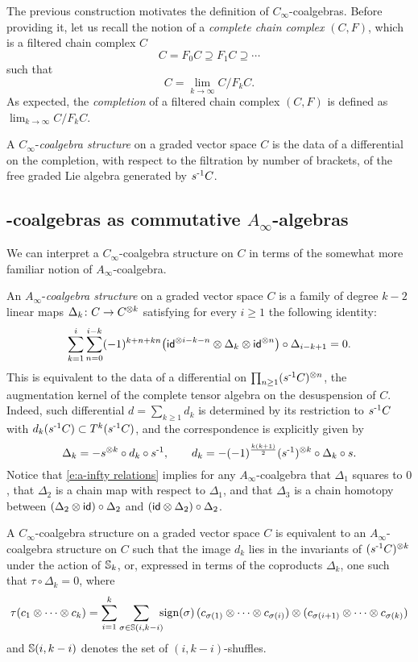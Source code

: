 The previous construction motivates the definition of $C_\infty$-coalgebras.
Before providing it, let us recall the notion of a \textit{complete chain complex} $(C, F)$, which is a filtered chain complex $C$
\[
C = F_0 C \supseteq F_1 C \supseteq \cdots
\]
such that
\[
C = \lim_{k\to \infty} C / F_k C.
\]
As expected, the \textit{completion} of a filtered chain complex $(C, F)$ is defined as $\lim_{k\to \infty} C / F_k C$.

A $C_\infty$-\textit{coalgebra structure} on a graded vector space $C$ is the data of a differential on the completion, with respect to the filtration by number of brackets, of the free graded Lie algebra generated by $s^{\mbox{\scriptsize -1}}C$.

\subsection{\pdfCinfty-coalgebras as commutative $A_\infty$-algebras} \label{ss:a-infty coalgebras}

We can interpret a $C_\infty$-coalgebra structure on $C$ in terms of the somewhat more familiar notion of $A_\infty$-coalgebra.

An $A_\infty$-\textit{coalgebra structure} on a graded vector space $C$ is a family of degree $k-2$ linear maps $\Delta_k \colon C \to C^{\otimes k}$ satisfying for every $i \geq 1$ the following identity:
\begin{equation} \label{e:a-infty relations}
	\sum_{k=1}^{i} \sum_{n=0}^{i-k} (-1)^{k+n+kn} \big( \mathsf{id}^{\otimes i-k-n} \otimes \Delta_k \otimes \mathsf{id}^{\otimes n} \big) \circ \Delta_{i-k+1} = 0.
\end{equation}
This is equivalent to the data of a differential on $\prod_{n \geq 1} (s^{\mbox{\scriptsize -1}} C)^{\otimes n}$, the augmentation kernel of the complete tensor algebra on the desuspension of $C$.
Indeed, such differential $d = \sum_{k \geq 1} d_k$ is determined by its restriction to $s^{\mbox{\scriptsize -1}} C$ with $d_k(s^{\mbox{\scriptsize -1}} C) \subset T^k(s^{\mbox{\scriptsize -1}} C)$, and the correspondence is explicitly given by
\[
\Delta_k = - s^{\otimes k} \circ d_k \circ s^{\mbox{\scriptsize -1}},
\qquad
d_k = -(-1)^{\frac{k(k+1)}{2}} (s^{\mbox{\scriptsize -1}})^{\otimes k} \circ \Delta_k \circ s.
\]
Notice that \eqref{e:a-infty relations} implies for any $A_\infty$-coalgebra that $\Delta_1$ squares to $0$, that $\Delta_2$ is a chain map with respect to $\Delta_1$, and that $\Delta_3$ is a chain homotopy between $(\Delta_2 \otimes \mathsf{id}) \circ \Delta_2$ and $(\mathsf{id} \otimes \Delta_2) \circ \Delta_2$.

A $C_\infty$-coalgebra structure on a graded vector space $C$ is equivalent to an $A_\infty$-coalgebra structure on $C$ such that the image $d_k$ lies in the invariants of $(s^{\mbox{\scriptsize -1}} C)^{\otimes k}$ under the action of $\mathbb{S}_k$, or, expressed in terms of the coproducts $\Delta_k$, one such that $\tau \circ \Delta_k = 0$, where
\[
\tau(c_1 \otimes \dotsb \otimes c_k) =
\sum_{i=1}^{k} \sum_{\sigma \in \mathbb{S}(i, k-i)}
\!\!\! \operatorname{sign}(\sigma) \,
(c_{\sigma(1)} \otimes \dotsb \otimes c_{\sigma(i)}) \otimes
(c_{\sigma(i+1)} \otimes \dotsb \otimes c_{\sigma(k)})
\]
and $\mathbb{S}(i, k-i)$ denotes the set of $(i, k-i)$-shuffles.

